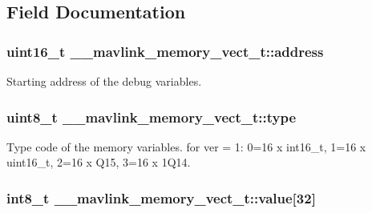\subsection{Field Documentation}
\hypertarget{struct____mavlink__memory__vect__t_a079a0cecfd6f6e3d47c4c1d324ddd29d}{
\subsubsection[{address}]{\setlength{\rightskip}{0pt plus 5cm}uint16\+\_\+t \+\_\+\+\_\+mavlink\+\_\+memory\+\_\+vect\+\_\+t\+::address}}\label{struct____mavlink__memory__vect__t_a079a0cecfd6f6e3d47c4c1d324ddd29d}


Starting address of the debug variables. 

\hypertarget{struct____mavlink__memory__vect__t_a5c37b4f5d396209693c7bb32097a6e88}{
\subsubsection[{type}]{\setlength{\rightskip}{0pt plus 5cm}uint8\+\_\+t \+\_\+\+\_\+mavlink\+\_\+memory\+\_\+vect\+\_\+t\+::type}}\label{struct____mavlink__memory__vect__t_a5c37b4f5d396209693c7bb32097a6e88}


Type code of the memory variables. for ver = 1\+: 0=16 x int16\+\_\+t, 1=16 x uint16\+\_\+t, 2=16 x Q15, 3=16 x 1\+Q14. 

\hypertarget{struct____mavlink__memory__vect__t_a9d2124dfb0efc698eff93eb6744654cf}{
\subsubsection[{value}]{\setlength{\rightskip}{0pt plus 5cm}int8\+\_\+t \+\_\+\+\_\+mavlink\+\_\+memory\+\_\+vect\+\_\+t\+::value\mbox{[}32\mbox{]}}}\label{struct____mavlink__memory__vect__t_a9d2124dfb0efc698eff93eb6744654cf}


